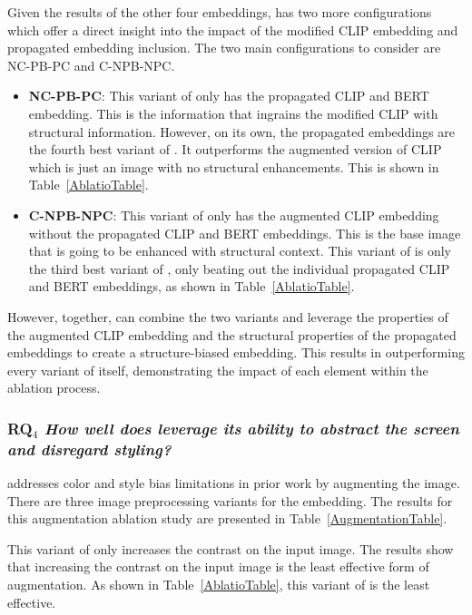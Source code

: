 Given the results of the other four embeddings, \FRAME has two more configurations which offer a direct insight into the impact of the modified CLIP embedding and propagated embedding inclusion. 
The two main configurations to consider are NC-PB-PC and C-NPB-NPC. 

\begin{itemize}
  \item \textbf{NC-PB-PC}: This variant of \FRAME only has the propagated CLIP and BERT embedding. This is the information that ingrains the modified CLIP with structural information. However, on its own, the propagated embeddings are the fourth best variant of \FRAME. It outperforms the augmented version of CLIP which is just an image with no structural enhancements. This is shown in Table~\ref{AblatioTable}.
  \item \textbf{C-NPB-NPC}: This variant of \FRAME only has the augmented CLIP embedding without the propagated CLIP and BERT embeddings. This is the base image that is going to be enhanced with structural context. This variant of \FRAME is only the third best variant of \FRAME, only beating out the individual propagated CLIP and BERT embeddings, as shown in Table~\ref{AblatioTable}.
\end{itemize}

However, together, \FRAME can combine the two variants and leverage the properties of the augmented CLIP embedding and the structural properties of the propagated embeddings to create a structure-biased embedding. This results in \FRAME outperforming every variant of itself, demonstrating the impact of each element within the ablation process. 

\subsubsection{\textbf{RQ$_4$} \textit{How well does \FRAME leverage its ability to abstract the screen and disregard styling?}}


\FRAME addresses color and style bias limitations in prior work by augmenting the image. There are three image preprocessing variants for the \FRAME embedding. The results for this augmentation ablation study are presented in Table~\ref{AugmentationTable}.

This variant of \FRAME only increases the contrast on the input image. The results show that increasing the contrast on the input image is the least effective form of augmentation. As shown in Table~\ref{AblatioTable}, this variant of \FRAME is the least effective. 

